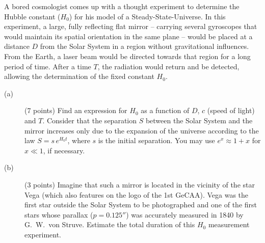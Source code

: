 A bored cosmologist comes up with a thought experiment to determine the Hubble
constant ($H_0$) for his model of a Steady-State-Universe. In this experiment,
a large, fully reflecting flat mirror -- carrying several gyroscopes that
would maintain its spatial orientation in the same plane -- would be placed at
a distance $D$ from the Solar System in a region without gravitational
influences. From the Earth, a laser beam would be directed towards that region
for a long period of time. After a time $T$, the radiation would return and be
detected, allowing the determination of the fixed constant $H_0$.

\begin{description}
\item[(a)] (7 points) Find an expression for $H_0$ as a function of $D$, $c$
  (speed of light) and $T$. Consider that the separation $S$ between the Solar
  System and the mirror increases only due to the expansion of the universe
  according to the law $S = s\,e^{H_0 t}$, where $s$ is the initial
  separation. You may use $e^x \approx 1 + x$ for $x \ll 1$, if necessary.
\item[(b)] (3 points) Imagine that such a mirror is located in the vicinity of
  the star Vega (which also features on the logo of the 1st GeCAA). Vega was
  the first star outside the Solar System to be photographed and one of the
  first stars whose parallax ($p = 0.125''$) was accurately measured in 1840
  by G.~W.~von Struve. Estimate the total duration of this $H_0$ measurement
  experiment.
\end{description}
